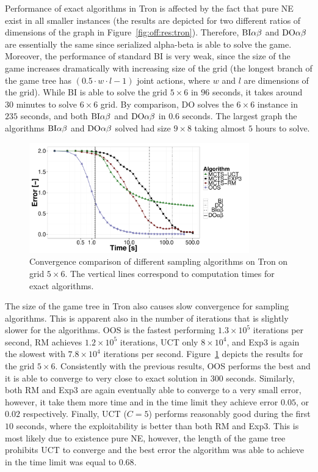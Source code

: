 Performance of exact algorithms in Tron is affected by the fact that pure NE exist in all smaller instances (the results are depicted for two different ratios of dimensions of the graph in Figure~\ref{fig:off:res:tron}).
Therefore, $\textrm{BI}\alpha\beta$ and $\textrm{DO}\alpha\beta$ are essentially the same since serialized alpha-beta is able to solve the game. 
Moreover, the performance of standard BI is very weak, since the size of the game increases dramatically with increasing size of the grid (the longest branch of the game tree has $\left(0.5\cdot w\cdot l - 1\right)$ joint actions, where $w$ and $l$ are dimensions of the grid). 
While BI is able to solve the grid $5\times6$ in $96$ seconds, it takes around $30$ minutes to solve $6\times6$ grid. 
By comparison, DO solves the $6\times6$ instance in $235$ seconds, and both $\textrm{BI}\alpha\beta$ and $\textrm{DO}\alpha\beta$ in $0.6$ seconds.
The largest graph the algorithms $\textrm{BI}\alpha\beta$ and $\textrm{DO}\alpha\beta$ solved had size $9\times8$ taking almost $5$ hours to solve. 

\begin{figure}[t]
\centering
\includegraphics[width=0.85\textwidth]{figures/convergence-tron.pdf}
\caption{Convergence comparison of different sampling algorithms on Tron on grid $5\times6$. The vertical lines correspond to computation times for exact algorithms.} \label{fig:off:conv:tron}
\end{figure}

The size of the game tree in Tron also causes slow convergence for sampling algorithms.
This is apparent also in the number of iterations that is slightly slower for the algorithms.
OOS is the fastest performing $1.3\times 10^5$ iterations per second, RM achieves $1.2\times 10^5$ iterations, UCT only $8\times10^4$, and Exp3 is again the slowest with $7.8\times10^4$ iterations per second.
Figure~\ref{fig:off:conv:tron} depicts the results for the grid $5\times6$.
Consistently with the previous results, OOS performs the best and it is able to converge to very close to exact solution in $300$ seconds. 
Similarly, both RM and Exp3 are again eventually able to converge to a very small error, however, it take them more time and in the time limit they achieve error $0.05$, or $0.02$ respectively. 
Finally, UCT ($C=5$) performs reasonably good during the first $10$ seconds, where the exploitability is better than both RM and Exp3. 
This is most likely due to existence pure NE, however, the length of the game tree prohibits UCT to converge and the best error the algorithm was able to achieve in the time limit was equal to $0.68$.

